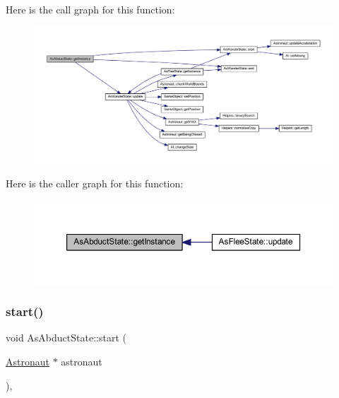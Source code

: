 Here is the call graph for this function\+:
\nopagebreak
\begin{figure}[H]
\begin{center}
\leavevmode
\includegraphics[width=350pt]{class_as_abduct_state_af2adec6fb71805d6a0fa2818c6c82e7d_cgraph}
\end{center}
\end{figure}
Here is the caller graph for this function\+:
\nopagebreak
\begin{figure}[H]
\begin{center}
\leavevmode
\includegraphics[width=350pt]{class_as_abduct_state_af2adec6fb71805d6a0fa2818c6c82e7d_icgraph}
\end{center}
\end{figure}
\mbox{\label{class_as_abduct_state_afad21e00707545b221d707932b22375e}} 
\subsubsection{\texorpdfstring{start()}{start()}}
{\footnotesize\ttfamily void As\+Abduct\+State\+::start (\begin{DoxyParamCaption}\item[{\hyperlink{class_astronaut}{Astronaut} $\ast$}]{astronaut }\end{DoxyParamCaption})\hspace{0.3cm}{\ttfamily [override]}, {\ttfamily [virtual]}}



